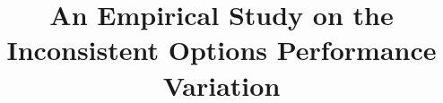 \documentclass[smallextended]{svjour3}       %
\newcommand{\inconsistent}{{\em IoPV}\xspace}
\begin{document}
\title{An Empirical Study on the Inconsistent Options Performance Variation}

\newcommand{\PQI}{How common are \inconsistent problems? }
\newcommand{\PQII}{How difficult is it to manually identify \inconsistent problems?}

\newcommand{\RQI}{What is the impact of configuration on the performance regression?}
\newcommand{\RQII}{How accurately can we predict \inconsistent problems? }
\newcommand{\RQIII}{What are the most important metrics for predicting \inconsistent problems? }

\author{
}

\maketitle
\end{document}
